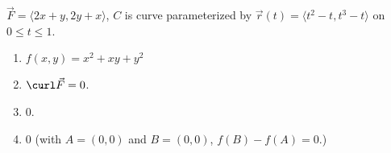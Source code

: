 {$\vec F = \langle 2x+y, 2y+x\rangle$, $C$ is curve parameterized by $\vec r(t) = \langle t^2-t, t^3-t\rangle$ on $0\leq t\leq 1$. 
}
{\begin{enumerate}
\item		$f(x,y) = x^2+xy+y^2$
\item	$\curl \vec F = 0$.
\item		$0$.%
\item	$0$ (with $A = (0,0)$ and $B = (0,0)$, $f(B) - f(A) = 0$.)
\end{enumerate}
}
